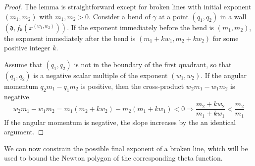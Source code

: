 \documentclass[11pt]{amsart}
\theoremstyle{remark}
\numberwithin{equation}{section}
\newcommand{\fd}{\mathfrak{d}}
\begin{document}
\begin{proof}
The lemma is straightforward except for broken lines with initial exponent $(m_1,m_2)$ with $m_1,m_2>0$.  
Consider a bend of $\gamma$ at a point $(q_1,q_2)$ in a wall $(\fd,f_{\fd}(x^{(w_1,w_2)}))$.  If the exponent immediately before the bend is $(m_1,m_2)$, the exponent immediately after the bend is $(m_1+kw_1,m_2+kw_2)$ for some positive integer $k$.  

Assume that $(q_1,q_2)$ is not in the boundary of the first quadrant, so that $(q_1,q_2)$ is a negative scalar multiple of the exponent $(w_1,w_2)$. If the angular momentum $q_2m_1-q_1m_2$ is positive, then the cross-product $w_2m_1-w_1m_2$ is negative. 
\[ w_2m_1-w_1m_2=m_1(m_2+kw_2)-m_2(m_1+kw_1)<0 \Rightarrow \frac{m_2+kw_2}{m_1+kw_1} < \frac{m_2}{m_1}\]
If the angular momentum is negative, the slope increases by the an identical argument.
\end{proof}

We can now constrain the possible final exponent of a broken line, which will be used to bound the Newton polygon of the corresponding theta function.
\end{document}
